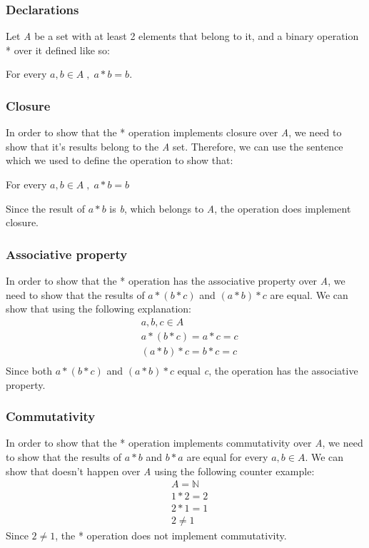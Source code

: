 \documentclass[12pt, oneside]{article}
\begin{document}
\subsubsection{Declarations}
Let \emph{A} be a set with at least 2 elements that belong to it, and a binary operation * over it defined like so:
\begin{center}
For every $a, b \in A\;,\;a * b = b$.
\end{center}

\subsubsection{Closure}
In order to show that the * operation implements closure over \emph{A}, we need to show that it's results belong to the \emph{A} set. Therefore, we can use the sentence which we used to define the operation to show that:
\begin{center}
For every $a, b \in A\;,\;a * b = b$
\end{center}
Since the result of $a * b$ is \emph{b}, which belongs to \emph{A}, the operation does implement closure.

\subsubsection{Associative property}
In order to show that the * operation has the associative property over \emph{A}, we need to show that the results of $a * (b * c)$ and $(a * b) * c$ are equal. We can show that using the following explanation:
\begin{equation*}
\begin{split}
& a, b, c \in A\\
& a * (b * c) = a * c = c\\
& (a * b) * c = b * c = c\\
\end{split}
\end{equation*}
Since both $a * (b * c)$ and $(a * b) * c$ equal \emph{c}, the operation has the associative property.
\clearpage

\subsubsection{Commutativity}
In order to show that the * operation implements commutativity over \emph{A}, we need to show that the results of $a * b$ and $b * a$ are equal for every $a, b \in A$. We can show that doesn't happen over \emph{A} using the following counter example:
\begin{equation*}
\begin{split}
& A = \mathbb{N}\\
& 1 * 2 = 2\\
& 2 * 1 = 1\\
& 2 \neq 1
\end{split}
\end{equation*}
Since $2 \neq 1$, the * operation does not implement commutativity.
\end{document}
